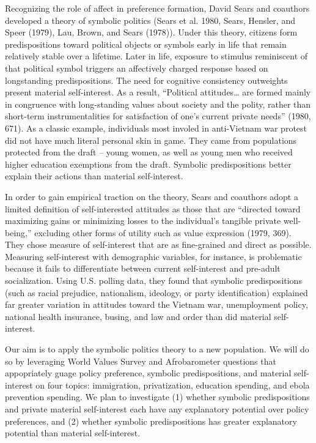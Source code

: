 \documentclass[]{article}
\begin{document}
Recognizing the role of affect in preference formation, David Sears and
coauthors developed a theory of symbolic politics (Sears et al. 1980,
Sears, Hensler, and Speer (1979), Lau, Brown, and Sears (1978)). Under
this theory, citizens form predispositions toward political objects or
symbols early in life that remain relatively stable over a lifetime.
Later in life, exposure to stimulus reminiscent of that political symbol
triggers an affectively charged response based on longstanding
predispositions. The need for cognitive consistency outweights present
material self-interest. As a result, ``Political attitudes\ldots{} are
formed mainly in congruence with long-standing values about society and
the polity, rather than short-term instrumentalities for satisfaction of
one's current private needs'' (1980, 671). As a classic example,
individuals most involed in anti-Vietnam war protest did not have much
literal personal skin in game. They came from populations protected from
the draft -- young women, as well as young men who received higher
education exemptions from the draft. Symbolic predispositions better
explain their actions than material self-interest.

In order to gain empirical traction on the theory, Sears and coauthors
adopt a limited definition of self-interested attitudes as those that
are ``directed toward maximizing gains or minimizing losses to the
individual's tangible private well-being,'' excluding other forms of
utility such as value expression (1979, 369). They chose measure of
self-interest that are as fine-grained and direct as possible. Measuring
self-interest with demographic variables, for instance, is problematic
because it fails to differentiate between current self-interest and
pre-adult socialization. Using U.S. polling data, they found that
symbolic predispositions (such as racial prejudice, nationalism,
ideology, or party identification) explained far greater variation in
attitudes toward the Vietnam war, unemployment policy, national health
insurance, busing, and law and order than did material self-interest.

Our aim is to apply the symbolic politics theory to a new population. We
will do so by leveraging World Values Survey and Afrobarometer questions
that appopriately guage policy preference, symbolic predispositions, and
material self-interest on four topics: immigration, privatization,
education spending, and ebola prevention spending. We plan to
investigate (1) whether symbolic predispositions and private material
self-interest each have any explanatory potential over policy
preferences, and (2) whether symbolic predispositions has greater
explanatory potential than material self-interest.
\end{document}

